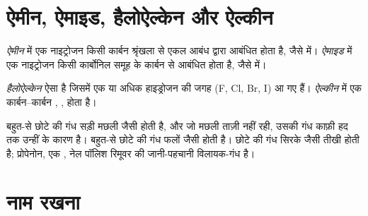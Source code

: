 \section{ऐमीन, ऐमाइड, हैलोऐल्केन और ऐल्कीन}


\begin{definition}[ऐमीन, ऐमाइड]\label{def:g11:functional-groups:amine}
\emph{ऐमीन} में एक नाइट्रोजन  किसी कार्बन श्रृंखला से
एकल आबंध द्वारा आबंधित होता है, जैसे  में। \emph{ऐमाइड} में एक नाइट्रोजन 
किसी कार्बोनिल समूह के कार्बन से आबंधित होता है, जैसे  में।
\end{definition}

\begin{definition}[हैलोऐल्केन, ऐल्कीन]\label{def:g11:functional-groups:halogenoalkane}
\emph{हैलोऐल्केन} ऐसा  है जिसमें एक
या अधिक हाइड्रोजन  की जगह   (F, Cl, Br, I) आ गए हैं।
\emph{ऐल्कीन} में एक कार्बन--कार्बन , , होता है।
\end{definition}

\begin{remark}[गंधें और समूह]\label{rem:g11:functional-groups:smells}
बहुत-से छोटे  की गंध सड़ी मछली जैसी होती है, और जो मछली ताज़ी नहीं रही,
उसकी गंध काफ़ी हद तक उन्हीं के कारण है। बहुत-से छोटे  की गंध फलों जैसी होती है।
छोटे  की गंध सिरके जैसी तीखी होती है; प्रोपेनोन, एक ,
नेल पॉलिश रिमूवर की जानी-पहचानी विलायक-गंध है।
\end{remark}

\section{नाम रखना}

